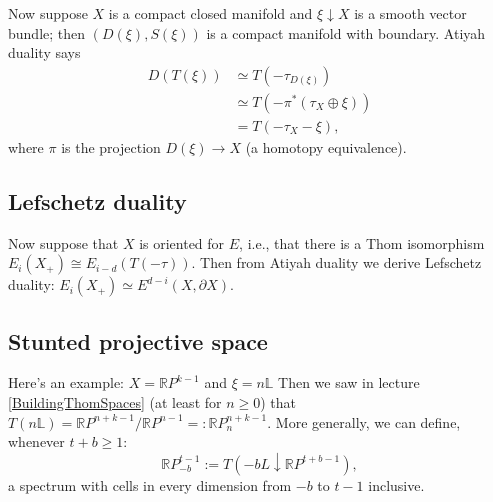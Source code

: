 \documentclass{article}
\newcommand{\R}{\mathbb{R}}
\newcommand{\RP}{\R P}
\newcommand{\bundle}[1]{\mathbb{#1}}
\renewcommand{\to}{\longrightarrow}
\theoremstyle{definition}
\begin{document}
Now suppose $X$ is a compact closed manifold and $\xi \downarrow X$ is a smooth vector bundle; then $(D(\xi), S(\xi))$ is a compact manifold with boundary.  Atiyah duality says
\begin{align*}
D(T(\xi)) 
& \simeq T(-\tau_{D(\xi)}) \\
& \simeq T(-\pi^*(\tau_X \oplus \xi)) \\
& = T(-\tau_X - \xi),
\end{align*}
where $\pi$ is the projection $D(\xi) \to X$ (a homotopy equivalence).
\subsection*{Lefschetz duality}
Now suppose that $X$ is oriented for $E$, i.e., that there is a Thom isomorphism $E_i(X_+)\cong E_{i-d}(T(-\tau))$. Then from Atiyah duality we derive Lefschetz duality: $E_i (X_+) \simeq E^{d-i}(X, \partial X)$.
\subsection*{Stunted projective space}
Here's an example: $X = \RP^{k-1}$ and $\xi = n \bundle{L}$ %
Then we saw in lecture \ref{BuildingThomSpaces} (at least for $n\geq0$) that $T(n \bundle{L}) = \RP^{n+k-1} / \RP^{n-1} =: \RP^{n+k-1}_n$.
More generally, we can define, whenever $t+b\geq1$:
\[\RP^{t-1}_{-b}:= T(-bL\downarrow\RP^{t+b-1}),\]
a spectrum with cells in every dimension from $-b$ to $t-1$ inclusive.
\end{document}
